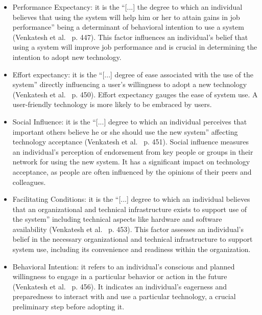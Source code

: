 \begin{itemize}
\item \textcolor{revised}{Performance Expectancy: it is the ``[...] the degree to which an individual believes that using the system will help him or her to attain gains in job performance'' being a determinant of behavioral intention to use a system (Venkatesh et al.~\cite{f451f9e9-c389-3030-ad8a-847378d73154} p. 447).
This factor influences an individual's belief that using a system will improve job performance and is crucial in determining the intention to adopt new technology.}
\item \textcolor{revised}{Effort expectancy: it is the ``[...] degree of ease associated with the use of the system'' directly influencing a user's willingness to adopt a new technology (Venkatesh et al.~\cite{f451f9e9-c389-3030-ad8a-847378d73154} p. 450).
Effort expectancy gauges the ease of system use.
A user-friendly technology is more likely to be embraced by users.}
\item \textcolor{revised}{Social Influence: it is the ``[...] degree to which an individual perceives that important others believe he or she should use the new system'' affecting technology acceptance (Venkatesh et al.~\cite{f451f9e9-c389-3030-ad8a-847378d73154} p. 451).
Social influence measures an individual's perception of endorsement from key people or groups in their network for using the new system.
It has a significant impact on technology acceptance, as people are often influenced by the opinions of their peers and colleagues.}
\item \textcolor{revised}{Facilitating Conditions: it is the ``[...] degree to which an individual believes that an organizational and technical infrastructure exists to support use of the system'' including technical aspects like hardware and software availability (Venkatesh et al.~\cite{f451f9e9-c389-3030-ad8a-847378d73154} p. 453).
This factor assesses an individual's belief in the necessary organizational and technical infrastructure to support system use, including its convenience and readiness within the organization.}
\item \textcolor{revised}{Behavioral Intention: it refers to an individual's conscious and planned willingness to engage in a particular behavior or action in the future (Venkatesh et al.~\cite{f451f9e9-c389-3030-ad8a-847378d73154} p. 456).
It indicates an individual's eagerness and preparedness to interact with and use a particular technology, a crucial preliminary step before adopting it.}
\end{itemize}

